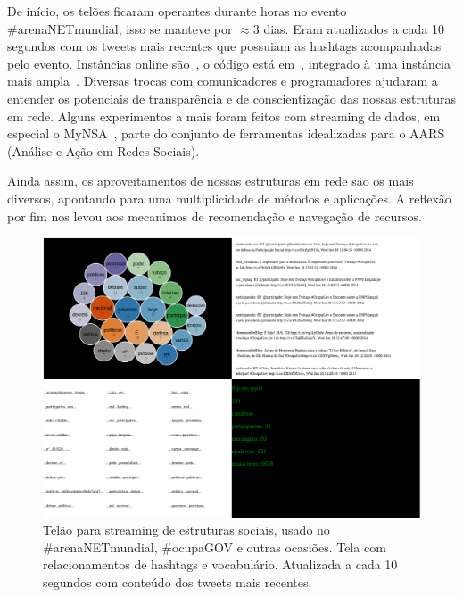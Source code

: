 \documentclass[a4paper, 11pt]{article} %
\begin{document}

De início, os telões ficaram operantes durante horas no evento \#arenaNETmundial, isso se manteve por $\approx 3$ dias. Eram atualizados a cada 10 segundos com os tweets mais recentes que possuiam as hashtags acompanhadas pelo evento. Instâncias online são~\cite{ocupagov,mmissa,mmissa2}, o código está em~\cite{codTelao}, integrado à uma instância mais ampla~\cite{mmissa2}. Diversas trocas com comunicadores e programadores ajudaram a entender os potenciais de transparência e de conscientização das nossas estruturas em rede. Alguns experimentos a mais foram feitos com streaming de dados, em especial o MyNSA~\cite{mynsa}, parte do conjunto de ferramentas idealizadas para o AARS (Análise e Ação em Redes Sociais).

Ainda assim, os aproveitamentos de nossas estruturas em rede são os mais diversos, apontando para uma multiplicidade de métodos e aplicações. A reflexão por fim nos levou aos mecanimos de recomendação e navegação de recursos.
\begin{figure}[h!]
  \centering
    \includegraphics[width=.7\textwidth]{telao2.png}
  \caption{\small Telão para streaming de estruturas sociais, usado no \#arenaNETmundial, \#ocupaGOV e outras ocasiões. Tela com relacionamentos de hashtags e vocabulário. Atualizada a cada 10 segundos com conteúdo dos tweets mais recentes.}\label{fig:telao2}
\end{figure}
\end{document}

